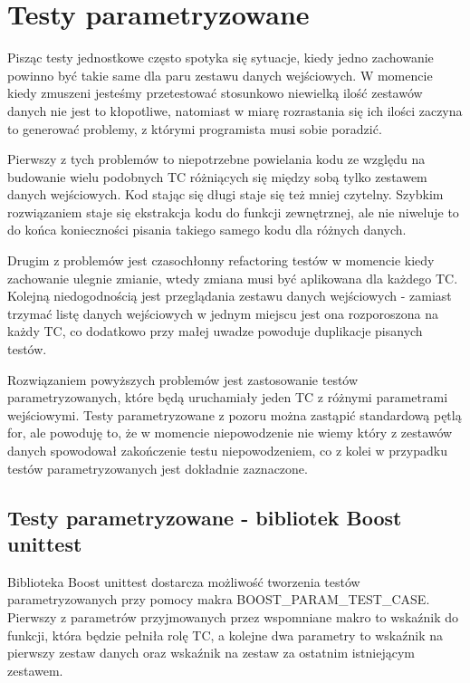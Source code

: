 \documentclass[12pt,a4paper,notitlepage]{report}
\begin{document}
\chapter{Testy parametryzowane}

Pisząc testy jednostkowe często spotyka się sytuacje, kiedy jedno zachowanie powinno być takie same dla paru zestawu danych wejściowych. W momencie kiedy zmuszeni jesteśmy przetestować stosunkowo niewielką ilość zestawów danych nie jest to kłopotliwe, natomiast w miarę rozrastania się ich ilości zaczyna to generować problemy, z którymi programista musi sobie poradzić.

Pierwszy z tych problemów to niepotrzebne powielania kodu ze względu na budowanie wielu podobnych TC różniących się między sobą tylko zestawem danych wejściowych. Kod stając się długi staje się też mniej czytelny.
Szybkim rozwiązaniem staje się ekstrakcja kodu do funkcji zewnętrznej, ale nie niweluje to do końca konieczności pisania takiego samego kodu dla różnych danych.

Drugim z problemów jest czasochłonny refactoring testów w momencie kiedy zachowanie ulegnie zmianie, wtedy zmiana musi być aplikowana dla każdego TC.
Kolejną niedogodnością jest przeglądania zestawu danych wejściowych - zamiast trzymać listę danych wejściowych w jednym miejscu jest ona rozporoszona na każdy TC, co dodatkowo przy małej uwadze powoduje duplikacje pisanych testów.

Rozwiązaniem powyższych problemów jest zastosowanie testów parametryzowanych, które będą uruchamiały jeden TC z różnymi parametrami wejściowymi. 
Testy parametryzowane z pozoru można zastąpić standardową pętlą for, ale powoduję to, że w momencie niepowodzenie nie wiemy który z zestawów danych spowodował zakończenie testu niepowodzeniem, co z kolei w przypadku testów parametryzowanych jest dokładnie zaznaczone.

\section{Testy parametryzowane - bibliotek Boost unittest}

Biblioteka Boost unittest dostarcza możliwość tworzenia testów parametryzowanych przy pomocy makra BOOST{\_}PARAM{\_}TEST{\_}CASE.
Pierwszy z parametrów przyjmowanych przez wspomniane makro to wskaźnik do funkcji, która będzie pełniła rolę TC, a kolejne dwa parametry to wskaźnik na pierwszy zestaw danych oraz wskaźnik na zestaw za ostatnim istniejącym zestawem.
\end{document}
